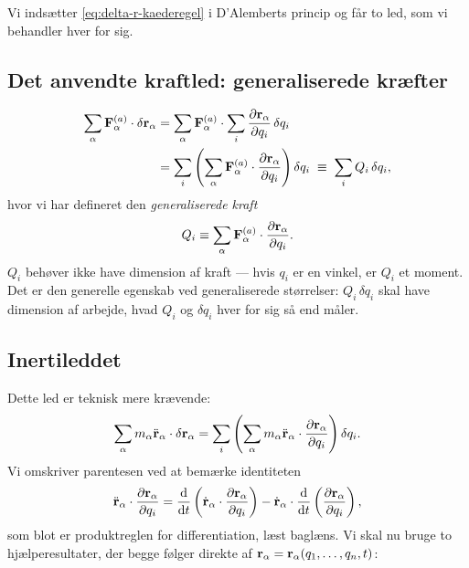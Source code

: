 Vi indsætter \eqref{eq:delta-r-kaederegel} i D'Alemberts princip og får
to led, som vi behandler hver for sig.

\subsection{Det anvendte kraftled: generaliserede kræfter}

\begin{align}
  \sum_\alpha \vb{F}_\alpha^{(a)}\cdot\delta\vb{r}_\alpha
  &= \sum_\alpha \vb{F}_\alpha^{(a)}\cdot\sum_i \pdv{\vb{r}_\alpha}{q_i}\,\delta q_i \\
  &= \sum_i \left(\sum_\alpha \vb{F}_\alpha^{(a)}\cdot\pdv{\vb{r}_\alpha}{q_i}\right)\delta q_i
  \;\equiv\; \sum_i Q_i\,\delta q_i,
\end{align}
hvor vi har defineret den \emph{generaliserede
kraft}
\begin{equation}
  Q_i \equiv \sum_\alpha \vb{F}_\alpha^{(a)}\cdot\pdv{\vb{r}_\alpha}{q_i}.
  \label{eq:generaliseret-kraft}
\end{equation}
$Q_i$ behøver ikke have dimension af kraft — hvis $q_i$ er en vinkel,
er $Q_i$ et moment. Det er den generelle egenskab ved generaliserede
størrelser: $Q_i\,\delta q_i$ skal have dimension af arbejde, hvad
$Q_i$ og $\delta q_i$ hver for sig så end måler.

\subsection{Inertileddet}

Dette led er teknisk mere krævende:
\begin{equation}
  \sum_\alpha m_\alpha\ddot{\vb{r}}_\alpha\cdot\delta\vb{r}_\alpha
  = \sum_i \left(\sum_\alpha m_\alpha\ddot{\vb{r}}_\alpha\cdot\pdv{\vb{r}_\alpha}{q_i}\right)\delta q_i.
\end{equation}
Vi omskriver parentesen ved at bemærke identiteten
\begin{equation}
  \ddot{\vb{r}}_\alpha\cdot\pdv{\vb{r}_\alpha}{q_i}
  = \dv{t}\left(\dot{\vb{r}}_\alpha\cdot\pdv{\vb{r}_\alpha}{q_i}\right)
    - \dot{\vb{r}}_\alpha\cdot\dv{t}\left(\pdv{\vb{r}_\alpha}{q_i}\right),
  \label{eq:produktregel-identitet}
\end{equation}
som blot er produktreglen for differentiation, læst baglæns. Vi skal
nu bruge to hjælperesultater, der begge følger direkte af
$\vb{r}_\alpha=\vb{r}_\alpha(q_1,\dots,q_n,t)$:

